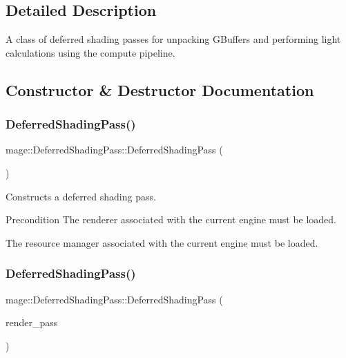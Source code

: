 \subsection{Detailed Description}
A class of deferred shading passes for unpacking G\+Buffers and performing light calculations using the compute pipeline. 

\subsection{Constructor \& Destructor Documentation}
\hypertarget{classmage_1_1_deferred_shading_pass_a348c86ce12342110299739d8d63c6aaf}{}\label{classmage_1_1_deferred_shading_pass_a348c86ce12342110299739d8d63c6aaf} 
\subsubsection{\texorpdfstring{Deferred\+Shading\+Pass()}{DeferredShadingPass()}\hspace{0.1cm}{\footnotesize\ttfamily [1/3]}}
{\footnotesize\ttfamily mage\+::\+Deferred\+Shading\+Pass\+::\+Deferred\+Shading\+Pass (\begin{DoxyParamCaption}{ }\end{DoxyParamCaption})}

Constructs a deferred shading pass.

\begin{DoxyPrecond}{Precondition}
The renderer associated with the current engine must be loaded. 

The resource manager associated with the current engine must be loaded. 
\end{DoxyPrecond}
\hypertarget{classmage_1_1_deferred_shading_pass_a4820a800b8ffc4cf0a7d155b09b71210}{}\label{classmage_1_1_deferred_shading_pass_a4820a800b8ffc4cf0a7d155b09b71210} 
\subsubsection{\texorpdfstring{Deferred\+Shading\+Pass()}{DeferredShadingPass()}\hspace{0.1cm}{\footnotesize\ttfamily [2/3]}}
{\footnotesize\ttfamily mage\+::\+Deferred\+Shading\+Pass\+::\+Deferred\+Shading\+Pass (\begin{DoxyParamCaption}\item[{const \hyperlink{classmage_1_1_deferred_shading_pass}{Deferred\+Shading\+Pass} \&}]{render\+\_\+pass }\end{DoxyParamCaption})\hspace{0.3cm}{\ttfamily [delete]}}

